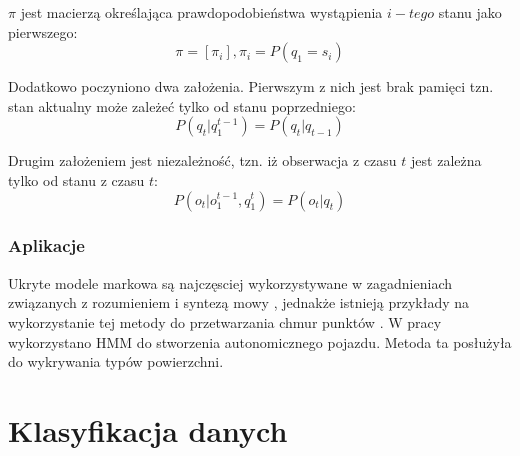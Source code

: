 $\pi$ jest macierzą określająca prawdopodobieństwa wystąpienia $i-tego$ stanu jako pierwszego:
\begin{equation}
    \pi = [\pi_{i}], \pi_{i} = P(q_{1} = s_{i})
\end{equation}

Dodatkowo poczyniono dwa założenia. Pierwszym z nich jest brak pamięci tzn. stan aktualny może zależeć tylko od stanu poprzedniego:
\begin{equation}
    P(q_{t}|q_{1}^{t-1}) = P(q_{t}|q_{t-1})
\end{equation}

Drugim założeniem jest niezależność, tzn. iż obserwacja z czasu $t$ jest zależna tylko od stanu z czasu $t$:
\begin{equation}
    P(o_{t}|o_{1}^{t-1},q_{1}^{t}) = P(o_{t}|q_{t})
\end{equation}

\subsubsection{Aplikacje}
Ukryte modele markowa są najczęsciej wykorzystywane w zagadnieniach związanych z rozumieniem i syntezą mowy \cite{blunsom2004}, jednakże istnieją przykłady na wykorzystanie tej metody do przetwarzania
chmur punktów \cite{wang2014}. W pracy \cite{wang2014} wykorzystano HMM do stworzenia autonomicznego pojazdu. Metoda ta posłużyła do wykrywania typów powierzchni.

\section{Klasyfikacja danych}
